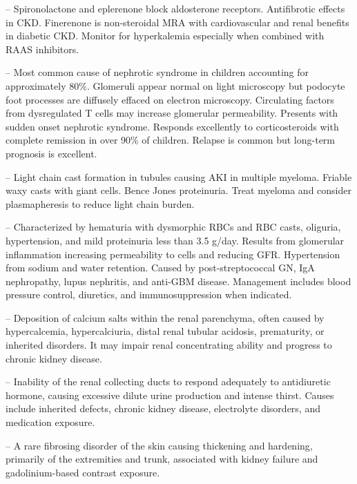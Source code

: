 -- Spironolactone and eplerenone block aldosterone receptors. Antifibrotic effects in CKD. Finerenone is non-steroidal MRA with cardiovascular and renal benefits in diabetic CKD. Monitor for hyperkalemia especially when combined with RAAS inhibitors.

-- Most common cause of nephrotic syndrome in children accounting for approximately 80\%. Glomeruli appear normal on light microscopy but podocyte foot processes are diffusely effaced on electron microscopy. Circulating factors from dysregulated T cells may increase glomerular permeability. Presents with sudden onset nephrotic syndrome. Responds excellently to corticosteroids with complete remission in over 90\% of children. Relapse is common but long-term prognosis is excellent.

-- Light chain cast formation in tubules causing AKI in multiple myeloma. Friable waxy casts with giant cells. Bence Jones proteinuria. Treat myeloma and consider plasmapheresis to reduce light chain burden.

-- Characterized by hematuria with dysmorphic RBCs and RBC casts, oliguria, hypertension, and mild proteinuria less than 3.5 g/day. Results from glomerular inflammation increasing permeability to cells and reducing GFR. Hypertension from sodium and water retention. Caused by post-streptococcal GN, IgA nephropathy, lupus nephritis, and anti-GBM disease. Management includes blood pressure control, diuretics, and immunosuppression when indicated.

-- Deposition of calcium salts within the renal parenchyma, often caused by hypercalcemia, hypercalciuria, distal renal tubular acidosis, prematurity, or inherited disorders. It may impair renal concentrating ability and progress to chronic kidney disease.

-- Inability of the renal collecting ducts to respond adequately to antidiuretic hormone, causing excessive dilute urine production and intense thirst. Causes include inherited defects, chronic kidney disease, electrolyte disorders, and medication exposure.

-- A rare fibrosing disorder of the skin causing thickening and hardening, primarily of the extremities and trunk, associated with kidney failure and gadolinium-based contrast exposure.

